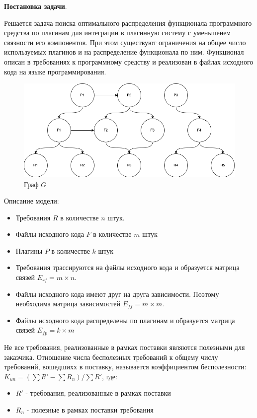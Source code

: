 \documentclass{article}
\begin{document}
  \textbf{Постановка задачи}.

  Решается задача поиска оптимального распределения функционала программного средства по плагинам для интеграции в плагинную систему с уменьшенем связности его компонентов. При этом существуют ограничения на общее число используемых плагинов и на распределение функционала по ним. Функционал описан в требованиях к программному средству и реализован в файлах исходного кода на языке программирования.

  \begin{figure}[H]
      \centering
      \includegraphics[width=1\textwidth]{Исходный граф.drawio}
      \caption{Граф $G$}
  \end{figure}

  Описание модели:
  \begin{itemize}
    \item Требования $R$ в количестве $n$ штук.
    \item Файлы исходного кода $F$ в количестве $m$ штук
    \item Плагины $P$ в количестве $k$ штук
    \item Требования трассируются на файлы исходного кода и образуется матрица связей $E_{rf} = m \times n$.
    \item Файлы исходного кода имеют друг на друга зависимости. Поэтому необходима матрица зависимостей $E_{ff} = m \times m$.
    \item Файлы исходного кода распределены по плагинам и образуется матрица связей $E_{fp} = k \times m$
  \end{itemize}

  Не все требования, реализованные в рамках поставки являются полезными для заказчика. Отношение числа бесполезных требований к общему числу требований, вошедшихх в поставку, называется коэффициентом бесполезности: $K_{un} = (\sum R' - \sum R_{n}) / \sum R'$, где:
  \begin{itemize}
    \item $R'$ - требования, реализованные в рамках поставки
    \item $R_{n}$ - полезные в рамках поставки требования
  \end{itemize}
\end{document}

